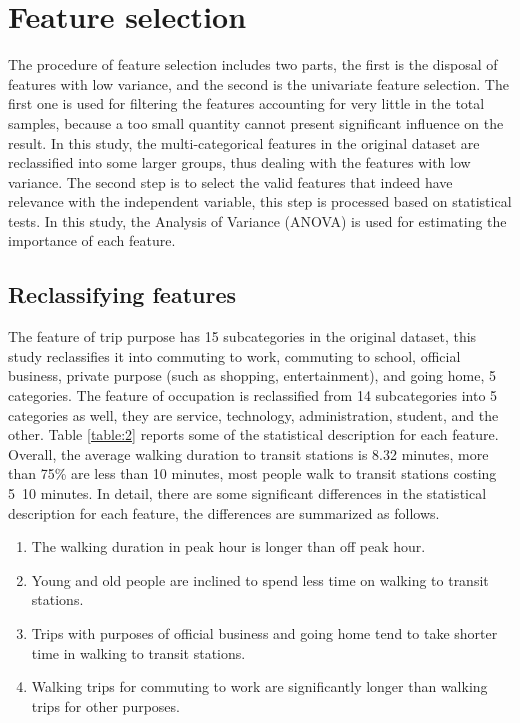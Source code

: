 \documentclass[Journal,letterpaper]{ascelike-new}
\begin{document}
%
\section{Feature selection}
The procedure of feature selection includes two parts, the first is the disposal of features with low variance, and the second is the univariate feature selection. The first one is used for filtering the features accounting for very little in the total samples, because a too small quantity cannot present significant influence on the result. In this study, the multi-categorical features in the original dataset are reclassified into some larger groups, thus dealing with the features with low variance. The second step is to select the valid features that indeed have relevance with the independent variable, this step is processed based on statistical tests. In this study, the Analysis of Variance (ANOVA) is used for estimating the importance of each feature.

%
\subsection{Reclassifying features}
The feature of trip purpose has 15 subcategories in the original dataset, this study reclassifies it into commuting to work, commuting to school, official business, private purpose (such as shopping, entertainment), and going home, 5 categories. The feature of occupation is reclassified from 14 subcategories into 5 categories as well, they are service, technology, administration, student, and the other. Table \ref{table:2} reports some of the statistical description for each feature. Overall, the average walking duration to transit stations is 8.32 minutes, more than 75\% are less than 10 minutes, most people walk to transit stations costing 5~10 minutes. In detail, there are some significant differences in the statistical description for each feature, the differences are summarized as follows.

%
\begin{enumerate}
    \item The walking duration in peak hour is longer than off peak hour.
    \item Young and old people are inclined to spend less time on walking to transit stations.
    \item Trips with purposes of official business and going home tend to take shorter time in walking to transit stations.
    \item Walking trips for commuting to work are significantly longer than walking trips for other purposes.
\end{enumerate}
\end{document}

